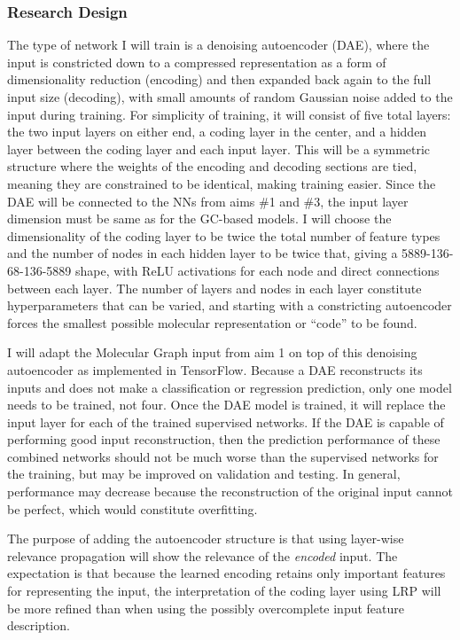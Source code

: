 \documentclass[12pt]{article}
\begin{document}
\subsubsection{Research Design}
\label{sec:org877e2a6}

The type of network I will train is a denoising autoencoder (DAE), where the input is constricted down to a compressed representation as a form of dimensionality reduction (encoding) and then expanded back again to the full input size (decoding), with small amounts of random Gaussian noise added to the input during training. For simplicity of training, it will consist of five total layers: the two input layers on either end, a coding layer in the center, and a hidden layer between the coding layer and each input layer. This will be a symmetric structure where the weights of the encoding and decoding sections are tied, meaning they are constrained to be identical, making training easier. Since the DAE will be connected to the NNs from aims \#1 and \#3, the input layer dimension must be same as for the GC-based models. I will choose the dimensionality of the coding layer to be twice the total number of feature types and the number of nodes in each hidden layer to be twice that, giving a 5889-136-68-136-5889 shape, with ReLU activations for each node and direct connections between each layer. The number of layers and nodes in each layer constitute hyperparameters that can be varied, and starting with a constricting autoencoder forces the smallest possible molecular representation or ``code'' to be found.

I will adapt the Molecular Graph input from aim 1 on top of this denoising autoencoder as implemented in TensorFlow\cite{tensorflow2015-whitepaper,github:tf,github:tf_dae}. Because a DAE reconstructs its inputs and does not make a classification or regression prediction, only one model needs to be trained, not four. Once the DAE model is trained, it will replace the input layer for each of the trained supervised networks. If the DAE is capable of performing good input reconstruction, then the prediction performance of these combined networks should not be much worse than the supervised networks for the training, but may be improved on validation and testing. In general, performance may decrease because the reconstruction of the original input cannot be perfect, which would constitute overfitting.

The purpose of adding the autoencoder structure is that using layer-wise relevance propagation will show the relevance of the \emph{encoded} input. The expectation is that because the learned encoding retains only important features for representing the input, the interpretation of the coding layer using LRP will be more refined than when using the possibly overcomplete input feature description.
\end{document}
